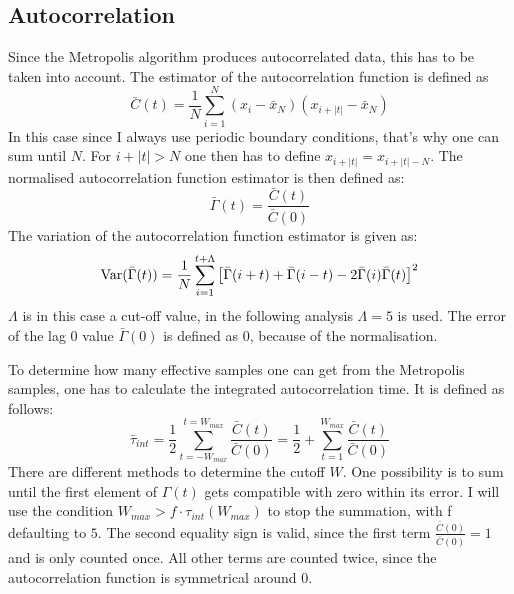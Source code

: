 \documentclass{scrartcl}
\begin{document}
	\subsection{Autocorrelation}
		Since the Metropolis algorithm produces autocorrelated data, this has to be taken into account.
		The estimator of the autocorrelation function is defined as
		\begin{equation}
			\bar C(t) = \frac 1{N} \sum_{i = 1}^{N} (x_i - \bar x_N)(x_{i + |t|} - \bar x_N)
			\label{eq:autocorrelation}
		\end{equation}
		In this case since I always use periodic boundary conditions, that's why one can sum until $N$.
		For $i + |t| > N$ one then has to define $x_{i + |t|} = x_{i + |t| - N}$.
		The normalised autocorrelation function estimator is then defined as:
		\begin{equation}
			\bar\Gamma(t) = \frac {\bar C(t)}{\bar C(0)}
			\label{eq:normalised_autocorrelation}
		\end{equation}
		The variation of the autocorrelation function estimator is given as:
		\begin{equation}
			\operatorname{Var}(\bar\Gamma(t)) = \frac 1N \sum_{i=1}^{t + \Lambda}\left[\bar\Gamma(i + t) + \bar\Gamma(i - t) - 2 \bar\Gamma(i)\bar\Gamma(t)\right]^2
			\label{eq:normalised_autocorrelation_error}
		\end{equation}
		$\Lambda$ is in this case a cut-off value, in the following analysis $\Lambda = 5$ is used.
		The error of the lag 0 value $\bar\Gamma(0)$ is defined as 0, because of the normalisation.

		To determine how many effective samples one can get from the Metropolis samples, one has to calculate the integrated autocorrelation time.
		It is defined as follows:
		\begin{equation}
			\bar \tau_{int} = \frac 12 \sum_{t = -W_{max}}^{t = W_{max}} \frac {\bar C(t)}{\bar C(0)} = \frac 12 + \sum_{t = 1}^{W_{max}} \frac {\bar C(t)}{\bar C(0)}
			\label{eq:integrated_autocorrelation}
		\end{equation}
		There are different methods to determine the cutoff $W$.
		One possibility is to sum until the first element of $\Gamma(t)$ gets compatible with zero within its error.
		I will use the condition $W_{max} > f \cdot \tau_{int}(W_{max})$ to stop the summation, with f defaulting to $5$.
		The second equality sign is valid, since the first term $\frac {\bar C(0)}{\bar C(0)} = 1$ and is only counted once.
		All other terms are counted twice, since the autocorrelation function is symmetrical around 0.
\end{document}
